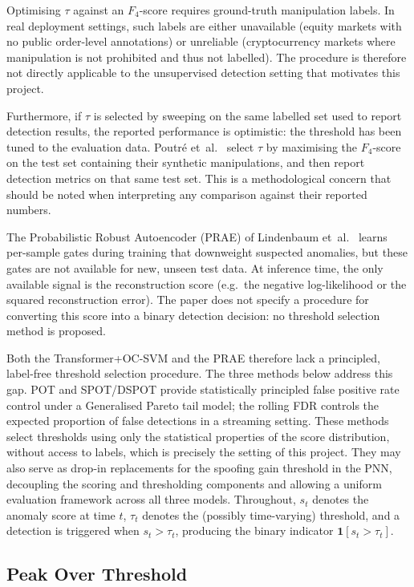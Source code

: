 \documentclass[11pt]{report}
\begin{document}
Optimising $\tau$ against an $F_4$-score requires ground-truth manipulation labels. In real deployment settings, such labels are either unavailable (equity markets with no public order-level annotations) or unreliable (cryptocurrency markets where manipulation is not prohibited and thus not labelled). The procedure is therefore not directly applicable to the unsupervised detection setting that motivates this project.

Furthermore, if $\tau$ is selected by sweeping on the same labelled set used to report detection results, the reported performance is optimistic: the threshold has been tuned to the evaluation data. Poutr\'e et~al.~\cite{poutre_2024} select $\tau$ by maximising the $F_4$-score on the test set containing their synthetic manipulations, and then report detection metrics on that same test set. This is a methodological concern that should be noted when interpreting any comparison against their reported numbers.

The Probabilistic Robust Autoencoder (PRAE) of Lindenbaum et~al.~\cite{lindenbaum2022prae} learns per-sample gates during training that downweight suspected anomalies, but these gates are not available for new, unseen test data. At inference time, the only available signal is the reconstruction score (e.g.\ the negative log-likelihood or the squared reconstruction error). The paper does not specify a procedure for converting this score into a binary detection decision: no threshold selection method is proposed.

Both the Transformer+OC-SVM and the PRAE therefore lack a principled, label-free threshold selection procedure.
The three methods below address this gap. POT and SPOT/DSPOT provide statistically principled false positive rate control under a Generalised Pareto tail model; the rolling FDR controls the expected proportion of false detections in a streaming setting. These methods select thresholds using only the statistical properties of the score distribution, without access to labels, which is precisely the setting of this project. They may also serve as drop-in replacements for the spoofing gain threshold in the PNN, decoupling the scoring and thresholding components and allowing a uniform evaluation framework across all three models. Throughout, $s_t$ denotes the anomaly score at time $t$, $\tau_t$ denotes the (possibly time-varying) threshold, and a detection is triggered when $s_t > \tau_t$, producing the binary indicator $\mathbf{1}[s_t > \tau_t]$.

\subsection{Peak Over Threshold}\label{sec:methodology:thresholds:pot}
\end{document}

